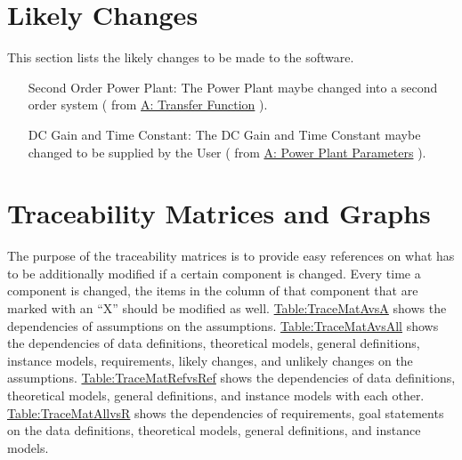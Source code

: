 \documentclass[12pt]{article}
\begin{document}
\section{Likely Changes}
\label{Sec:LCs}
This section lists the likely changes to be made to the software.

\begin{itemize}
\item[Second Order Power Plant:\phantomsection\label{likeChgIC}]{The Power Plant maybe changed into a second order system ( from  \hyperref[pwrPlantTxFnx]{A: Transfer Function} ).}
\item[DC Gain and Time Constant:\phantomsection\label{likeChgPP}]{The DC Gain and Time Constant maybe changed to be supplied by the User ( from  \hyperref[dcGainTimeConst]{A: Power Plant Parameters} ).}
\end{itemize}
\section{Traceability Matrices and Graphs}
\label{Sec:TraceMatrices}
The purpose of the traceability matrices is to provide easy references on what has to be additionally modified if a certain component is changed. Every time a component is changed, the items in the column of that component that are marked with an ``X'' should be modified as well. \hyperref[Table:TraceMatAvsA]{Table:TraceMatAvsA} shows the dependencies of assumptions on the assumptions. \hyperref[Table:TraceMatAvsAll]{Table:TraceMatAvsAll} shows the dependencies of data definitions, theoretical models, general definitions, instance models, requirements, likely changes, and unlikely changes on the assumptions. \hyperref[Table:TraceMatRefvsRef]{Table:TraceMatRefvsRef} shows the dependencies of data definitions, theoretical models, general definitions, and instance models with each other. \hyperref[Table:TraceMatAllvsR]{Table:TraceMatAllvsR} shows the dependencies of requirements, goal statements on the data definitions, theoretical models, general definitions, and instance models.
\end{document}
